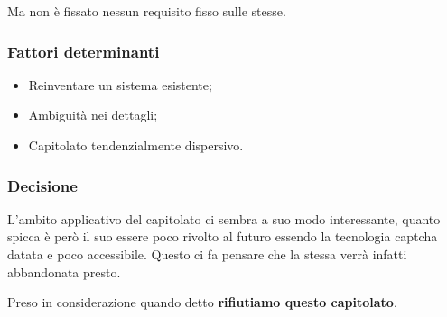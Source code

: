 Ma non è fissato nessun requisito fisso sulle stesse.

\subsubsection{Fattori determinanti}
\begin{itemize}
    \item Reinventare un sistema esistente;
    \item Ambiguità nei dettagli;
    \item Capitolato tendenzialmente dispersivo.
\end{itemize}

\subsubsection{Decisione}
L'ambito applicativo del capitolato ci sembra a suo modo interessante, quanto spicca è però il suo essere poco rivolto al futuro essendo la tecnologia captcha datata e poco accessibile. Questo ci fa pensare che la stessa verrà infatti abbandonata presto.

Preso in considerazione quando detto \textbf{rifiutiamo questo capitolato}.
